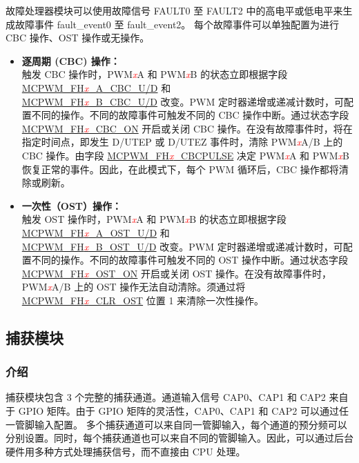 \documentclass[main\_\_CN.tex]{subfiles}
\begin{document}
故障处理器模块可以使用故障信号 FAULT0 至 FAULT2 中的高电平或低电平来生成故障事件 fault\_event0 至 fault\_event2。 每个故障事件可以单独配置为进行 CBC 操作、OST 操作或无操作。

\begin{itemize}
    \item {\bfseries 逐周期 (CBC) 操作：}\\
    触发 CBC 操作时，PWM\textcolor{red}{\it{x}}A 和 PWM\textcolor{red}{\it{x}}B 的状态立即根据字段 \hyperref[fielddesc:MCPWMFH0ACBCU]{MCPWM\_FH\textcolor{red}{\it{x}}\_A\_CBC\_U/D} 和 \\\hyperref[fielddesc:MCPWMFH0BCBCU]{MCPWM\_FH\textcolor{red}{\it{x}}\_B\_CBC\_U/D} 改变。PWM 定时器递增或递减计数时，可配置不同的操作。不同的故障事件可触发不同的 CBC 操作中断。通过状态字段 \hyperref[fielddesc:MCPWMFH0CBCON]{MCPWM\_FH\textcolor{red}{\it{x}}\_CBC\_ON} 开启或关闭 CBC 操作。在没有故障事件时，将在指定时间点，即发生 D/UTEP 或 D/UTEZ 事件时，清除 PWM\textcolor{red}{\it{x}}A/B 上的 CBC 操作。由字段 \hyperref[fielddesc:MCPWMFH0CBCPULSE]{MCPWM\_FH\textcolor{red}{\it{x}}\_CBCPULSE} 决定 PWM\textcolor{red}{\it{x}}A 和 PWM\textcolor{red}{\it{x}}B 恢复正常的事件。因此，在此模式下，每个 PWM 循环后，CBC 操作都将清除或刷新。
    \item {\bfseries 一次性（OST）操作：}\\
	触发 OST 操作时，PWM\textcolor{red}{\it{x}}A 和 PWM\textcolor{red}{\it{x}}B 的状态立即根据字段 \hyperref[fielddesc:MCPWMFH0AOSTU]{MCPWM\_FH\textcolor{red}{\it{x}}\_A\_OST\_U/D} 和 \\\hyperref[fielddesc:MCPWMFH0BOSTU]{MCPWM\_FH\textcolor{red}{\it{x}}\_B\_OST\_U/D} 改变。PWM 定时器递增或递减计数时，可配置不同的操作。不同的故障事件可触发不同的 OST 操作中断。通过状态字段  \hyperref[fielddesc:MCPWMFH0OSTON]{MCPWM\_FH\textcolor{red}{\it{x}}\_OST\_ON} 开启或关闭 OST 操作。在没有故障事件时，PWM\textcolor{red}{\it{x}}A/B 上的 OST 操作无法自动清除。须通过将 \hyperref[fielddesc:MCPWMFH0CLROST]{MCPWM\_FH\textcolor{red}{\it{x}}\_CLR\_OST} 位置 1 来清除一次性操作。
\end{itemize}

\subsection{捕获模块}
\subsubsection{介绍}

捕获模块包含 3 个完整的捕获通道。通道输入信号 CAP0、CAP1 和 CAP2 来自于 GPIO 矩阵。由于 GPIO 矩阵的灵活性，CAP0、CAP1 和 CAP2 可以通过任一管脚输入配置。 多个捕获通道可以来自同一管脚输入，每个通道的预分频可以分别设置。同时，每个捕获通道也可以来自不同的管脚输入。因此，可以通过后台硬件用多种方式处理捕获信号，而不直接由 CPU 处理。
\end{document}

